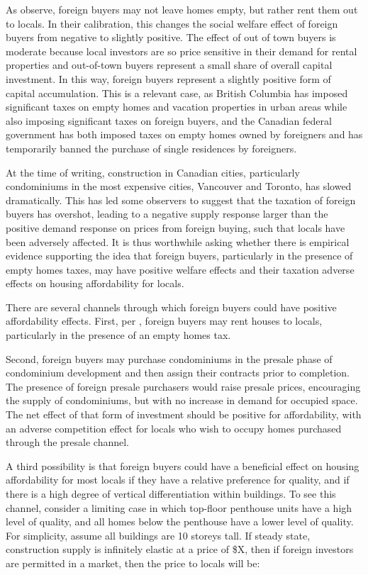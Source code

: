\documentclass[12pt]{article}
\begin{document}
As \textcite{favilukisVanNieuwerburgh} observe, foreign buyers may not leave
homes empty, but rather rent them out to locals. In their calibration, this
changes the social welfare effect of foreign buyers from negative to slightly
positive. The effect of out of town buyers is moderate because local investors
are so price sensitive in their demand for rental properties and out-of-town
buyers represent a small share of overall capital investment. In this way,
foreign buyers represent a slightly positive form of capital accumulation. This
is a relevant case, as British Columbia has imposed significant taxes on empty
homes and vacation properties in urban areas while also imposing significant
taxes on foreign buyers, and the Canadian federal government has both imposed
taxes on empty homes owned by foreigners and has temporarily banned the
purchase of single residences by foreigners.

At the time of writing, construction in Canadian cities, particularly
condominiums in the most expensive cities, Vancouver and Toronto, has slowed
dramatically. This has led some observers to suggest that the taxation of
foreign buyers has overshot, leading to a negative supply response larger than
the positive demand response on prices from foreign buying, such that locals
have been adversely affected. It is thus worthwhile asking whether there is
empirical evidence supporting the idea that foreign buyers, particularly in the
presence of empty homes taxes, may have positive welfare effects and their
taxation adverse effects on housing affordability for locals.

There are several channels through which foreign buyers could have positive
affordability effects. First, per \textcite{favilukisVanNieuwerburgh}, foreign
buyers may rent houses to locals, particularly in the presence of an empty
homes tax. 

Second, foreign buyers may purchase condominiums in the presale phase of
condominium development and then assign their contracts prior to completion.
The presence of foreign presale purchasers would raise presale prices,
encouraging the supply of condominiums, but with no increase in demand for
occupied space. The net effect of that form of investment should be positive
for affordability, with an adverse competition effect for locals who wish to
occupy homes purchased through the presale channel.

A third possibility is that foreign buyers could have a beneficial effect on
housing affordability for most locals if they have a relative preference for
quality, and if there is a high degree of vertical differentiation within
buildings. To see this channel, consider a limiting case in which top-floor
penthouse units have a high level of quality, and all homes below the penthouse
have a lower level of quality. For simplicity, assume all buildings are 10
storeys tall. If steady state, construction supply is infinitely elastic at a
price of \$X, then if foreign investors are permitted in a market, then the
price to locals will be:
\end{document}
